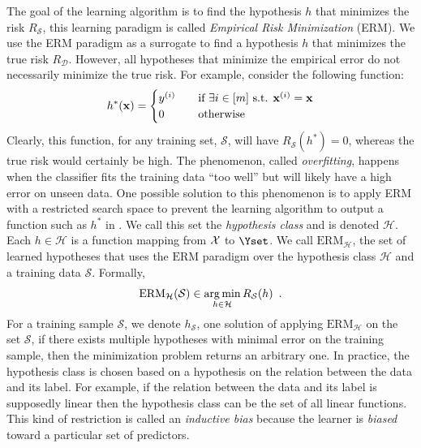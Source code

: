 The goal of the learning algorithm is to find the hypothesis $h$ that minimizes the risk $R_{\mathcal{S}}$, this learning paradigm is called \emph{Empirical Risk Minimization} (ERM).
We use the ERM paradigm as a surrogate to find a hypothesis $h$ that minimizes the true risk $R_\mathcal{D}$.
However, all hypotheses that minimize the empirical error do not necessarily minimize the true risk.
For example, consider the following function:
\begin{equation} \label{equation:ch2-perfect_function}
  h^*(\mathbf{x}) =
  \begin{cases}
    y^{(i)} &\quad \text{if }\exists i \in [m] \text{ s.t. } \mathbf{x}^{(i)} = \mathbf{x} \\
    0 &\quad \text{otherwise}
  \end{cases}
\end{equation}
Clearly, this function, for any training set, $\mathcal{S}$, will have $R_\mathcal{S}(h^*) = 0$, whereas the true risk would certainly be high.
The phenomenon, called \emph{overfitting}, happens when the classifier fits the training data ``too well'' but will likely have a high error on unseen data.
One possible solution to this phenomenon is to apply ERM with a restricted search space to prevent the learning algorithm to output a function such as $h^*$ in .
We call this set the \emph{hypothesis class} and is denoted $\mathcal{H}$.
Each $h \in \mathcal{H}$ is a function mapping from $\mathcal{X}$ to $\Yset$.
We call $\mathrm{ERM}_{\mathcal{H}}$, the set of learned hypotheses that uses the $\mathrm{ERM}$ paradigm over the hypothesis class $\mathcal{H}$ and a training data $\mathcal{S}$.
Formally,
\begin{equation}
  \mathrm{ERM}_{\mathcal{H}}(\mathcal{S}) \in \operatorname*{arg\,min}_{h \in \mathcal{H}} R_{\mathcal{S}}(h) \enspace.
\end{equation}
For a training sample $\mathcal{S}$, we denote $h_\mathcal{S}$, one solution of applying $\text{ERM}_\mathcal{H}$ on the set $\mathcal{S}$, if there exists multiple hypotheses with minimal error on the training sample, then the minimization problem returns an arbitrary one.
In practice, the hypothesis class is chosen based on a hypothesis on the relation between the data and its label.
For example, if the relation between the data and its label is supposedly linear then the hypothesis class can be the set of all linear functions.
This kind of restriction is called an \emph{inductive bias} because the learner is \emph{biased} toward a particular set of predictors.

